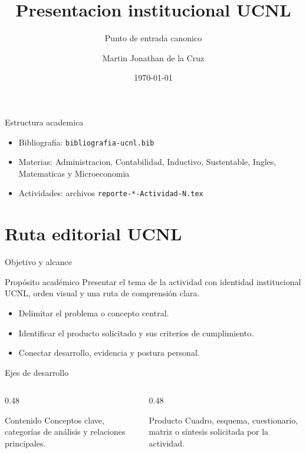 ﻿\documentclass[spanish,aspectratio=169]{beamer}
\title{Presentacion institucional UCNL}
\subtitle{Punto de entrada canonico}
\author{Martin Jonathan de la Cruz}
\institute{Universidad Ciudadana de Nuevo Leon}
\date{\today}
\begin{document}
\begin{frame}
  \titlepage
\end{frame}

\begin{frame}{Estructura academica}
  \begin{itemize}
    \item Bibliografia: \texttt{bibliografia-ucnl.bib}
    \item Materias: Administracion, Contabilidad, Inductivo, Sustentable, Ingles, Matematicas y Microeconomia
    \item Actividades: archivos \texttt{reporte-*-Actividad-N.tex}
  \end{itemize}
\end{frame}


\section{Ruta editorial UCNL}

\begin{frame}{Objetivo y alcance}
  \begin{block}{Propósito académico}
    Presentar el tema de la actividad con identidad institucional UCNL, orden visual y una ruta de comprensión clara.
  \end{block}
  \begin{itemize}
    \item Delimitar el problema o concepto central.
    \item Identificar el producto solicitado y sus criterios de cumplimiento.
    \item Conectar desarrollo, evidencia y postura personal.
  \end{itemize}
\end{frame}

\begin{frame}{Ejes de desarrollo}
  \begin{columns}[T,totalwidth=\textwidth]
    \begin{column}{0.48\textwidth}
      \begin{block}{Contenido}
        Conceptos clave, categorías de análisis y relaciones principales.
      \end{block}
    \end{column}
    \begin{column}{0.48\textwidth}
      \begin{block}{Producto}
        Cuadro, esquema, cuestionario, matriz o síntesis solicitada por la actividad.
      \end{block}
    \end{column}
  \end{columns}
\end{frame}
\end{document}
